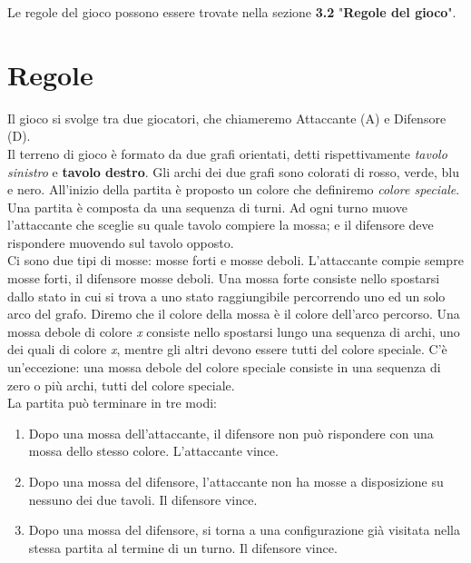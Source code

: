 \documentclass[a4paper,12pt,twoside,openright]{report}
\begin{document}
 Le regole del gioco possono essere trovate nella sezione \textbf{3.2} "\textbf{Regole del gioco}".

\section{Regole}

Il gioco si svolge tra due giocatori, che chiameremo Attaccante (A) e Difensore (D).\\
Il terreno di gioco è formato da due grafi orientati, detti rispettivamente \textit{tavolo sinistro} e \textbf{tavolo destro}. Gli archi dei due grafi sono colorati di rosso, verde, blu e nero. All'inizio della
partita è proposto un colore che definiremo \textit{colore speciale}.\\
Una partita è composta da una sequenza di turni. Ad ogni turno muove l’attaccante che sceglie su quale tavolo compiere la mossa; e il difensore deve rispondere muovendo sul tavolo opposto.\\
Ci sono due tipi di mosse: mosse forti e mosse deboli. L’attaccante compie sempre mosse forti, il difensore mosse deboli. Una mossa forte consiste nello spostarsi dallo stato in cui si trova a uno stato raggiungibile percorrendo uno ed un solo arco del grafo. Diremo che il colore della mossa è il colore dell’arco percorso. Una mossa debole di colore \textit{x} consiste nello spostarsi lungo una sequenza di archi, uno dei quali di colore \textit{x}, mentre gli altri devono essere tutti del colore speciale. C'è un’eccezione: una mossa debole del colore speciale consiste in una sequenza di zero o più archi, tutti del colore speciale.\\
La partita può terminare in tre modi:

\begin{enumerate}
\item Dopo una mossa dell’attaccante, il difensore non può rispondere con una mossa dello stesso colore. L’attaccante vince.

\item Dopo una mossa del difensore, l’attaccante non ha mosse a disposizione su nessuno dei due tavoli. Il difensore vince.

\item Dopo una mossa del difensore, si torna a una configurazione già visitata nella stessa partita al termine di un turno. Il difensore vince.
\end{enumerate}
\end{document}
